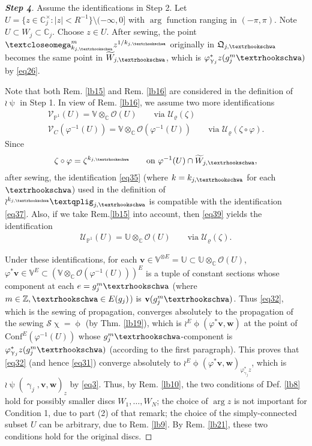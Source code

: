 \documentclass[12pt,a4paper,notitlepage]{article}
\theoremstyle{definition}
\theoremstyle{plain}
\newcommand{\fk}{\mathfrak}
\newcommand{\mc}{\mathcal}
\newcommand{\wtd}{\widetilde}
\newcommand{\Conf}{\mathrm{Conf}}
\newcommand{\scr}{\mathscr}
\newcommand{\Vbb}{\mathbb V}
\newcommand{\Ubb}{\mathbb U}
\newcommand{\Cbb}{\mathbb C}
\newcommand{\Zbb}{\mathbb Z}
\newcommand{\Pbb}{\mathbb P}
\newcommand{\vbf}{\mathbf v}
\newcommand{\wbf}{\mathbf w}
\newcommand{\tipaomega}{\text{\textcloseomega}}
\newcommand{\tipae}{\text{\textrhookschwa}}
\newcommand{\tipxphi}{\text{\textqplig}}
\numberwithin{equation}{subsection}
\begin{document}
\begin{proof}[\textbf{Step 4}] Assume the identifications in Step 2. Let $U=\{z\in\Cbb_j^\times:|z|<R^{-1}\}\setminus (-\infty,0]$ with $\arg$ function ranging in $(-\pi,\pi)$. Note $U\subset W_j\subset\Cbb_j$. Choose $z\in U$. After sewing, the point $\tipaomega_{k_{j,\tipae}}^mz^{1/k_{j,\tipae}}$ originally in $\fk Q_{j,\tipae}$ becomes the same point in $\wtd W_{j,\tipae}$, which is $\varphi^*_{\upgamma_j}z(g_j^m\tipae)$ by \eqref{eq26}. 

Note that both Rem.  \ref{lb15} and Rem. \ref{lb16} are considered in the definition of $\wr\uppsi$ in Step 1. In view of Rem. \ref{lb16}, we assume two more identifications
\begin{gather}
	\scr V_{\Pbb^1}(U)=\Vbb\otimes_\Cbb\scr O(U)	\qquad\text{via }\mc U_\varrho(\zeta)\label{eq39}\\
	\scr V_C(\varphi^{-1}(U))=\Vbb\otimes_\Cbb\scr O(\varphi^{-1}(U))\qquad\text{via }\mc U_\varrho(\zeta\circ\varphi).	\label{eq37}
\end{gather}
Since
\begin{align*}
	\zeta\circ\varphi=\zeta^{k_{j,\tipae}}\qquad\text{on }\varphi^{-1}(U)\cap \wtd W_{j,\tipae},
\end{align*}
after sewing,  the identification \eqref{eq35} (where $k=k_{j,\tipae}$ for each $\tipae$) used in the definition of $\wr^{{k_{j,\tipae}}}\tipxphi_{j,\tipae}$ is compatible with the identification \eqref{eq37}. Also, if we take Rem.\ref{lb15} into account, then \eqref{eq39} yields the identification
\begin{align}
\scr U_{\Pbb^1}(U)=\Ubb\otimes_\Cbb\scr O(U)\qquad\text{via }\mc U_\varrho(\zeta).
\end{align}


Under these identifications, for each $\vbf\in\Vbb^{\otimes E}=\Ubb\subset\Ubb\otimes_\Cbb\scr O(U)$,  $\varphi^*\vbf\in\Vbb^E\subset(\Vbb\otimes_\Cbb\scr O(\varphi^{-1}(U)))^E$ is a tuple of constant sections whose component at each $e=g_j^m\tipae$ (where $m\in\Zbb,\tipae\in E(g_j)$) is $\vbf(g_j^m\tipae)$. Thus \eqref{eq32}, which is the sewing of propagation, converges absolutely to the propagation of the sewing $\scr S\upchi=\upphi$ (by Thm. \ref{lb19}), which is $\wr^E\upphi(\varphi^*\vbf,\wbf)$ at the point of $\Conf^E(\varphi^{-1}(U))$ whose $g_j^m\tipae$-component is $\varphi^*_{\upgamma_j}z(g_j^m\tipae)$ (according to the first paragraph). This proves that \eqref{eq32} (and hence \eqref{eq31}) converge absolutely to $\wr^E\upphi(\varphi^*\vbf,\wbf)_{\varphi_{\upgamma_j}^*z}$, which is $\wr\uppsi(\upgamma_j,\vbf,\wbf)_z$ by \eqref{eq3}. Thus, by Rem. \ref{lb10}, the two conditions of Def. \ref{lb8} hold for possibly smaller discs $W_1,\dots,W_N$; the choice of $\arg z$ is not important for Condition 1, due to part (2) of that remark; the choice of the simply-connected subset $U$ can be arbitrary, due to Rem. \ref{lb9}. By Rem. \ref{lb21}, these two conditions hold for the original discs.
\end{proof}
\end{document}
